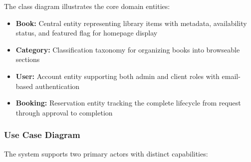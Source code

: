 \documentclass[12pt,a4paper]{article}
\begin{document}
The class diagram illustrates the core domain entities:

\begin{itemize}[leftmargin=*]
\item \textbf{Book:} Central entity representing library items with metadata, availability status, and featured flag for homepage display
\item \textbf{Category:} Classification taxonomy for organizing books into browseable sections
\item \textbf{User:} Account entity supporting both admin and client roles with email-based authentication
\item \textbf{Booking:} Reservation entity tracking the complete lifecycle from request through approval to completion
\end{itemize}

\subsubsection{Use Case Diagram}

The system supports two primary actors with distinct capabilities:
\end{document}
